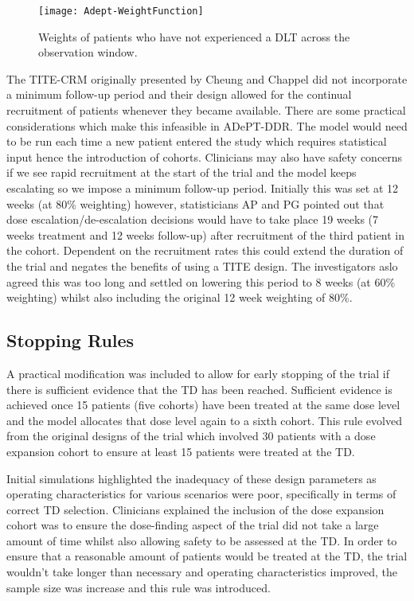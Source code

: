 \begin{figure}[h!]
	\centering
	\caption[Weight function across the follow-up period.]{Weights of patients who have not experienced a DLT across the observation window.}
	\label{fig_adept:weight_function}
	\texttt{[image: Adept-WeightFunction]}
\end{figure}


The TITE-CRM originally presented by Cheung and Chappel \cite{cheungSequentialDesignsPhase2000} did not incorporate a minimum follow-up period and their design allowed for the continual recruitment of patients whenever they became available. There are some practical considerations which make this infeasible in ADePT-DDR. The model would need to be run each time a new patient entered the study which requires statistical input hence the introduction of cohorts. Clinicians may also have safety concerns if we see rapid recruitment at the start of the trial and the model keeps escalating so we impose a minimum follow-up period. Initially this was set at 12 weeks (at 80\% weighting) however, statisticians AP and PG  pointed out that dose escalation/de-escalation decisions would have to take place 19 weeks (7 weeks treatment and 12 weeks follow-up) after recruitment of the third patient in the cohort. Dependent on the recruitment rates this could extend the duration of the trial and negates the benefits of using a TITE design. The investigators aslo agreed this was too long and settled on lowering this period to 8 weeks (at 60\% weighting) whilst also including the original 12 week weighting of 80\%.


\subsection{Stopping Rules}
\label{adept:Stopping-rules}

A practical modification was included to allow for early stopping of the trial if there is sufficient evidence that the TD has been reached. Sufficient evidence is achieved once 15 patients (five cohorts) have been treated at the same dose level and the model allocates that dose level again to a sixth cohort. This rule evolved from the original designs of the trial which involved 30 patients with a dose expansion cohort to ensure at least 15 patients were treated at the TD. 

Initial simulations highlighted the inadequacy of these design parameters as operating characteristics for various scenarios were poor, specifically in terms of correct TD selection. Clinicians explained the inclusion of the dose expansion cohort was to ensure the dose-finding aspect of the trial did not take a large amount of time whilst also allowing safety to be assessed at the TD. In order to ensure that a reasonable amount of patients would be treated at the TD, the trial wouldn't take longer than necessary and operating characteristics improved, the sample size was increase and this rule was introduced.

